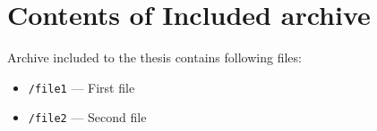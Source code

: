 \setcounter{figure}{0}
\setcounter{listing}{0}
\appendixpagenumbering

\chapter{Contents of Included archive \label{appendix:contents} }

Archive included to the thesis contains following files:

\begin{itemize}[noitemsep]
\item \texttt{/file1} --- First file
\item \texttt{/file2} --- Second file
\end{itemize}


